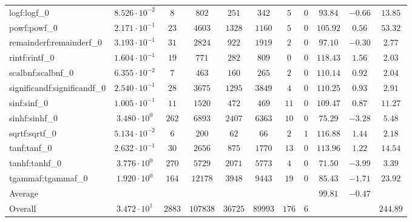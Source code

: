 \begin{tabular}{|l|c|c|c|c|c|c|c|c|c|c|}
logf:logf\_0                 & $ 8.526 \cdot 10^{-2} $ & $ 8      $ & $ 802    $ & $ 251   $ & $ 342   $ & $ 5   $ & $ 0 $ & $ 93.84       $ & $ -0.66   $ & $ 13.85   $ \\
powf:powf\_0                 & $ 2.171 \cdot 10^{-1} $ & $ 23     $ & $ 4603   $ & $ 1328  $ & $ 1160  $ & $ 5   $ & $ 0 $ & $ 105.92      $ & $ 0.56    $ & $ 53.32   $ \\
remainderf:remainderf\_0     & $ 3.193 \cdot 10^{-1} $ & $ 31     $ & $ 2824   $ & $ 922   $ & $ 1919  $ & $ 2   $ & $ 0 $ & $ 97.10       $ & $ -0.30   $ & $ 2.77    $ \\
rintf:rintf\_0               & $ 1.604 \cdot 10^{-1} $ & $ 19     $ & $ 771    $ & $ 282   $ & $ 809   $ & $ 0   $ & $ 0 $ & $ 118.43      $ & $ 1.56    $ & $ 2.03    $ \\
scalbnf:scalbnf\_0           & $ 6.355 \cdot 10^{-2} $ & $ 7      $ & $ 463    $ & $ 160   $ & $ 265   $ & $ 2   $ & $ 0 $ & $ 110.14      $ & $ 0.92    $ & $ 2.04    $ \\
significandf:significandf\_0 & $ 2.540 \cdot 10^{-1} $ & $ 28     $ & $ 3675   $ & $ 1295  $ & $ 3849  $ & $ 4   $ & $ 0 $ & $ 110.25      $ & $ 0.93    $ & $ 2.91    $ \\
sinf:sinf\_0                 & $ 1.005 \cdot 10^{-1} $ & $ 11     $ & $ 1520   $ & $ 472   $ & $ 469   $ & $ 11  $ & $ 0 $ & $ 109.47      $ & $ 0.87    $ & $ 11.27   $ \\
sinhf:sinhf\_0               & $ 3.480 \cdot 10^{0}  $ & $ 262    $ & $ 6893   $ & $ 2407  $ & $ 6363  $ & $ 10  $ & $ 0 $ & $ 75.29       $ & $ -3.28   $ & $ 5.48    $ \\
sqrtf:sqrtf\_0               & $ 5.134 \cdot 10^{-2} $ & $ 6      $ & $ 200    $ & $ 62    $ & $ 66    $ & $ 2   $ & $ 1 $ & $ 116.88      $ & $ 1.44    $ & $ 2.18    $ \\
tanf:tanf\_0                 & $ 2.632 \cdot 10^{-1} $ & $ 30     $ & $ 2656   $ & $ 875   $ & $ 1770  $ & $ 13  $ & $ 0 $ & $ 113.96      $ & $ 1.22    $ & $ 14.54   $ \\
tanhf:tanhf\_0               & $ 3.776 \cdot 10^{0}  $ & $ 270    $ & $ 5729   $ & $ 2071  $ & $ 5773  $ & $ 4   $ & $ 0 $ & $ 71.50       $ & $ -3.99   $ & $ 3.39    $ \\
tgammaf:tgammaf\_0           & $ 1.920 \cdot 10^{0}  $ & $ 164    $ & $ 12178  $ & $ 3948  $ & $ 9443  $ & $ 19  $ & $ 0 $ & $ 85.43       $ & $ -1.71   $ & $ 23.92   $ \\
\hline
Average                      & $                     $ & $        $ & $        $ & $       $ & $       $ & $     $ & $   $ & $ 99.81       $ & $ -0.47   $ & $         $ \\
\hline
Overall                      & $ 3.472 \cdot 10^{1}  $ & $ 2883   $ & $ 107838 $ & $ 36725 $ & $ 89993 $ & $ 176 $ & $ 6 $ & $             $ & $         $ & $ 244.89  $ \\
\hline
\end{tabular}

